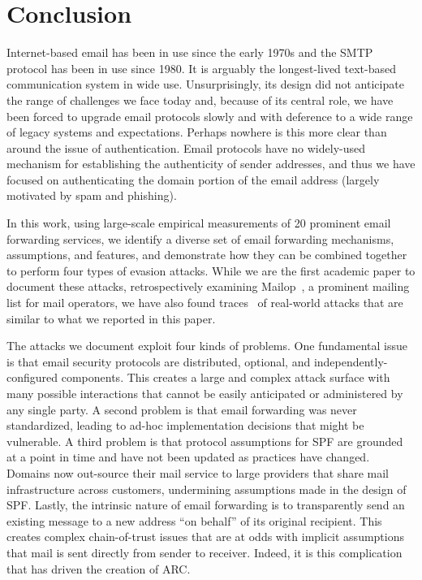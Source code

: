 \section{Conclusion}
\label{sec:discussion}
Internet-based email has been in use since the early 1970s
and the SMTP protocol has been in use since 1980.  It is arguably the
longest-lived text-based communication system in wide use.
Unsurprisingly, its design did not anticipate the range of challenges
we face today and, because of its central role, we have been forced
to upgrade email protocols slowly and with deference to a wide range
of legacy systems and expectations. Perhaps nowhere is this more clear
than around the issue of authentication.  Email protocols have no
widely-used mechanism for establishing the authenticity of sender
addresses, and thus we have focused on authenticating the domain
portion of the email address (largely motivated by spam and phishing).

In this work, using large-scale empirical measurements of 20 prominent email forwarding services, we identify a diverse set of email forwarding mechanisms, assumptions, and features, and demonstrate how they can be combined together to perform four types of evasion attacks. While we are the first academic paper to document these attacks, retrospectively examining Mailop~\cite{Mailop96:online}, a prominent mailing list for mail operators, we have also found traces~\cite{RealTraces} of real-world attacks that are similar to what we reported in this paper. 

The attacks we document exploit four kinds of problems. One fundamental issue is that email security protocols are
distributed, optional, and independently-configured components. This creates a large and complex attack surface with many
possible interactions that cannot be easily anticipated or
administered by any single party. A second problem is that email forwarding was never standardized, leading to ad-hoc implementation decisions that might be vulnerable. A third problem is that protocol assumptions for SPF are grounded at a
point in time and have not been updated as practices have changed. Domains now out-source their mail service to large providers that share mail infrastructure across customers, undermining assumptions made in the design of SPF. Lastly, the intrinsic nature of email forwarding is to transparently send an existing message to a new address ``on behalf'' of its original recipient. 
This creates complex chain-of-trust issues that are at odds with implicit assumptions that mail is sent directly from sender to receiver. Indeed, it is this complication that has driven the creation of ARC.


